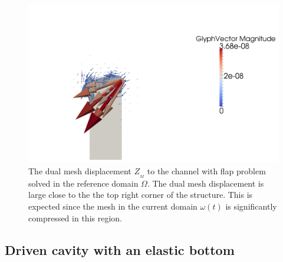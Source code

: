 \begin{figure}
  \begin{center}
    \includegraphics[scale=0.15]{chapters/selim/png/channelZM.png}
    \caption{The dual mesh displacement $Z_{_{M}}$ to the channel with
      flap problem solved in the reference domain $\Omega$. The dual mesh
      displacement is large close to the the top right corner of the
      structure. This is expected since the mesh in the current domain
      $\omega(t)$ is significantly compressed in this region.}
    \label{selim:fig:dual_channel_2}
  \end{center}
\end{figure}

\subsection{Driven cavity with an elastic bottom}

